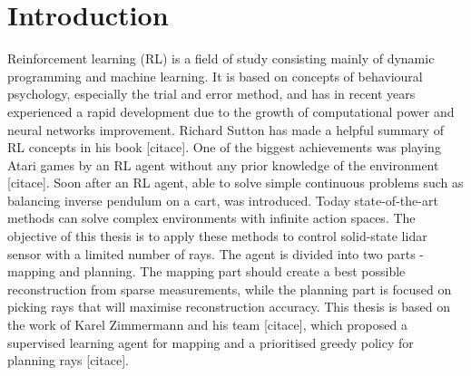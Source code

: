 \section{Introduction}

Reinforcement learning (RL) is a field of study consisting mainly of dynamic programming and machine learning. It is based on concepts of behavioural psychology, especially the trial and error method, and has in recent years experienced a rapid development due to the growth of computational power and neural networks improvement. Richard Sutton has made a helpful summary of RL concepts in his book [citace]. One of the biggest achievements was playing Atari games by an RL agent without any prior knowledge of the environment [citace]. Soon after an RL agent, able to solve simple continuous problems such as balancing inverse pendulum on a cart, was introduced. Today state-of-the-art methods can solve complex environments with infinite action spaces. The objective of this thesis is to apply these methods to control solid-state lidar sensor with a limited number of rays. The agent is divided into two parts - mapping and planning. The mapping part should create a best possible reconstruction from sparse measurements, while the planning part is focused on picking rays that will maximise reconstruction accuracy. This thesis is based on the work of Karel Zimmermann and his team [citace], which proposed a supervised learning agent for mapping and a prioritised greedy policy for planning rays [citace].
